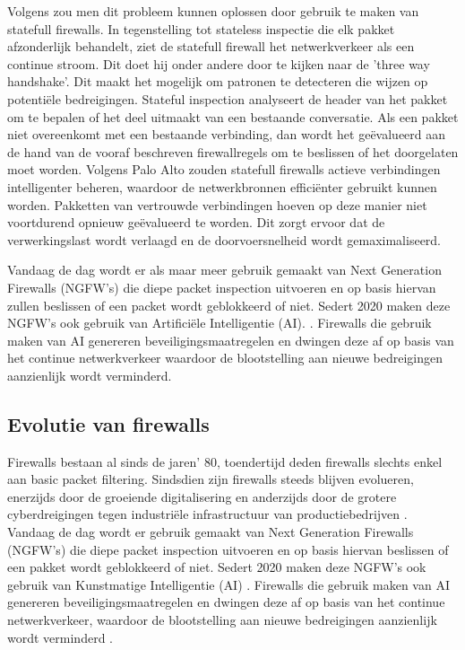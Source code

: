 \vspace{5mm}
Volgens \textcite{paloAltoSF2025} zou men dit probleem kunnen oplossen door gebruik te maken van statefull firewalls. In tegenstelling tot stateless inspectie die elk pakket afzonderlijk behandelt, ziet de statefull firewall het netwerkverkeer als een continue stroom. Dit doet hij onder andere door te kijken naar de 'three way handshake'. Dit maakt het mogelijk om patronen te detecteren die wijzen op potentiële bedreigingen. Stateful inspection analyseert de header van het pakket om te bepalen of het deel uitmaakt van een bestaande conversatie. Als een pakket niet overeenkomt met een bestaande verbinding, dan wordt het geëvalueerd aan de hand van de vooraf beschreven firewallregels om te beslissen of het doorgelaten moet worden. Volgens Palo Alto zouden statefull firewalls actieve verbindingen intelligenter beheren, waardoor de netwerkbronnen efficiënter gebruikt kunnen worden. Pakketten van vertrouwde verbindingen hoeven op deze manier niet voortdurend opnieuw geëvalueerd te worden. Dit zorgt ervoor dat de verwerkingslast wordt verlaagd en de doorvoersnelheid wordt gemaximaliseerd. 

\vspace{5mm}
Vandaag de dag wordt er als maar meer gebruik gemaakt van Next Generation Firewalls (NGFW’s) die diepe packet inspection uitvoeren en op basis hiervan zullen beslissen of een packet wordt geblokkeerd of niet. Sedert 2020 maken deze NGFW’s ook gebruik van Artificiële Intelligentie (AI). \autocite{Ahmadi2023}. 
Firewalls die gebruik maken van AI genereren beveiligingsmaatregelen en dwingen deze af op basis van het continue netwerkverkeer waardoor de blootstelling aan nieuwe bedreigingen aanzienlijk wordt verminderd. \autocite{PaloAltoFW2024}

\subsection{Evolutie van firewalls}
Firewalls bestaan al sinds de jaren’ 80, toendertijd deden firewalls slechts enkel aan basic packet filtering. Sindsdien zijn firewalls steeds blijven evolueren, enerzijds door de groeiende digitalisering en anderzijds door de grotere cyberdreigingen tegen industriële infrastructuur van productiebedrijven \autocite{Wusteney2021}. 
Vandaag de dag wordt er gebruik gemaakt van Next Generation Firewalls (NGFW’s) die diepe packet inspection uitvoeren en op basis hiervan beslissen of een pakket wordt geblokkeerd of niet. Sedert 2020 maken deze NGFW’s ook gebruik van Kunstmatige Intelligentie (AI) \textcite{Ahmadi2023}. Firewalls die gebruik maken van AI genereren beveiligingsmaatregelen en dwingen deze af op basis van het continue netwerkverkeer, waardoor de blootstelling aan nieuwe bedreigingen aanzienlijk wordt verminderd \textcite{PaloAltoFW2024}.


